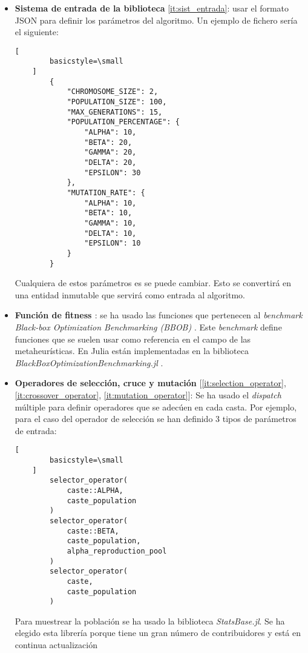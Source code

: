 \begin{itemize}
    \item \textbf{Sistema de entrada de la biblioteca} \ref{it:sist_entrada}: usar el formato JSON para definir los parámetros
    del algoritmo. Un ejemplo de fichero sería el siguiente:
    \begin{lstlisting}[
        basicstyle=\small
    ]
        {
            "CHROMOSOME_SIZE": 2,
            "POPULATION_SIZE": 100,
            "MAX_GENERATIONS": 15,
            "POPULATION_PERCENTAGE": {
                "ALPHA": 10,
                "BETA": 20,
                "GAMMA": 20,
                "DELTA": 20,
                "EPSILON": 30
            },
            "MUTATION_RATE": {
                "ALPHA": 10,
                "BETA": 10,
                "GAMMA": 10,
                "DELTA": 10,
                "EPSILON": 10
            }
        }
    \end{lstlisting}

    Cualquiera de estos parámetros es se puede cambiar. Esto se convertirá en una entidad inmutable que servirá como 
    entrada al algoritmo.

    \item \textbf{Función de fitness \cite{project_repository_8}}: se ha usado las funciones que pertenecen al \emph{benchmark}
    \emph{ Black-box Optimization Benchmarking (BBOB)} \cite{bbob_definition}. Este \emph{benchmark} define funciones que se suelen 
    usar como referencia en el campo de las metaheurísticas. En Julia están implementadas en la biblioteca 
    \emph{BlackBoxOptimizationBenchmarking.jl} \cite{bbob_jl}.

    \item \textbf{Operadores de selección, cruce y mutación} [\ref{it:selection_operator}, \ref{it:crossover_operator}, \ref{it:mutation_operator}]:
    Se ha usado el \emph{dispatch} múltiple para definir operadores que se adecúen en cada casta. Por ejemplo, para el caso del
    operador de selección se han definido 3 tipos de parámetros de entrada:

    \begin{lstlisting}[
        basicstyle=\small
    ]
        selector_operator(
            caste::ALPHA, 
            caste_population
        )
        selector_operator(
            caste::BETA, 
            caste_population, 
            alpha_reproduction_pool
        )
        selector_operator(
            caste, 
            caste_population
        )
    \end{lstlisting}
    
    Para muestrear la población se ha usado la biblioteca \emph{StatsBase.jl}. Se ha elegido esta librería porque
    tiene un gran número de contribuidores y está en continua actualización
\end{itemize}

